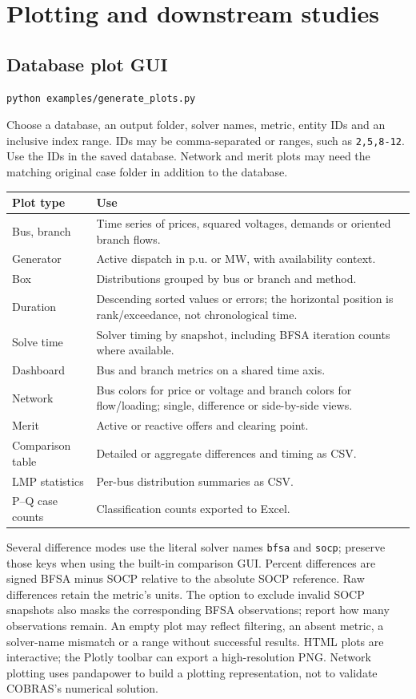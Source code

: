 \documentclass[11pt,a4paper]{article}
\newcommand{\code}[1]{\nolinkurl{#1}}
\begin{document}
\section{Plotting and downstream studies}
\label{sec:plots}
\subsection{Database plot GUI}
\begin{lstlisting}
python examples/generate_plots.py
\end{lstlisting}
Choose a database, an output folder, solver names, metric, entity IDs and an
inclusive index range. IDs may be comma-separated or ranges, such as
\code{2,5,8-12}. Use the IDs in the saved database. Network and merit plots
may need the matching original case folder in addition to the database.

\begin{longtable}{p{.24\linewidth}p{.68\linewidth}}
\toprule Plot type & Use \\\midrule\endhead
Bus, branch & Time series of prices, squared voltages, demands or oriented branch flows.\\
Generator & Active dispatch in p.u. or MW, with availability context.\\
Box & Distributions grouped by bus or branch and method.\\
Duration & Descending sorted values or errors; the horizontal position is rank/exceedance, not chronological time.\\
Solve time & Solver timing by snapshot, including BFSA iteration counts where available.\\
Dashboard & Bus and branch metrics on a shared time axis.\\
Network & Bus colors for price or voltage and branch colors for flow/loading; single, difference or side-by-side views.\\
Merit & Active or reactive offers and clearing point.\\
Comparison table & Detailed or aggregate differences and timing as CSV.\\
LMP statistics & Per-bus distribution summaries as CSV.\\
P--Q case counts & Classification counts exported to Excel.\\
\bottomrule
\end{longtable}
Several difference modes use the literal solver names \code{bfsa} and
\code{socp}; preserve those keys when using the built-in comparison GUI.
Percent differences are signed BFSA minus SOCP relative to the absolute SOCP
reference. Raw differences retain the metric's units. The option to exclude
invalid SOCP snapshots also masks the corresponding BFSA observations;
report how many observations remain. An empty plot may reflect filtering,
an absent metric, a solver-name mismatch or a range without successful results.
HTML plots are interactive; the Plotly toolbar can export a high-resolution
PNG. Network plotting uses pandapower to build a plotting representation,
not to validate COBRAS's numerical solution.
\end{document}
